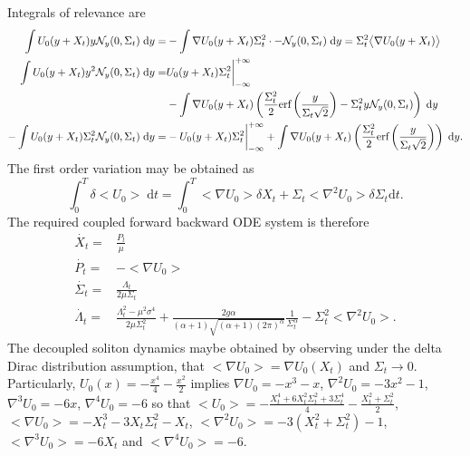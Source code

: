 \documentclass[letterpaper, 12pt]{article}
\newcommand{\rd}{{\mathrm d}}
\newcommand{\calN}{{\cal N}}
\begin{document}
Integrals of relevance are
\begin{align}
	\int U_0(y + X_t) y \calN_y(0,\Sigma_t) \; \rd y =& -\int \nabla U_0(y + X_t) \Sigma_t^2\cdot -\calN_y(0,\Sigma_t) \; \rd y = \Sigma_t^2 \big<  \nabla U_0(y + X_t) \big> \\
	\int U_0(y + X_t) y^2 \calN_y(0,\Sigma_t) \; \rd y =& U_0(y + X_t) \Sigma_t^2 \bigg|_{-\infty}^{+\infty} \\
	&- \int \nabla U_0(y + X_t) \left( \frac{\Sigma_t^2}{2}\text{erf}\left(\frac{y}{\Sigma_t \sqrt{2}}\right) - \Sigma_t^2 y \calN_y(0,\Sigma_t)   \right) \; \rd y \\
	-\int U_0(y + X_t) \Sigma_t^2 \calN_y(0,\Sigma_t) \; \rd y =& - U_0(y + X_t) \Sigma_t^2 \bigg|_{-\infty}^{+\infty} + \int \nabla U_0(y + X_t) \left( \frac{\Sigma_t^2}{2}\text{erf}\left(\frac{y}{\Sigma_t \sqrt{2}}\right) \right) \; \rd y.
\end{align}
The first order variation may be obtained as
\begin{equation}
	\int_{0}^{T} \delta \big< U_0 \big> \; \rd t = \int_{0}^{T} \big<\nabla U_0 \big> \delta X_t + \Sigma_t \big<\nabla^2 U_0 \big> \delta \Sigma_t \rd t.
\end{equation}
The required coupled forward backward ODE system is therefore
\begin{align}
	\dot{X_t} =& \frac{P_t}{\mu} \\
	\dot{P_t} =& - \big<\nabla U_0 \big> \\
	\dot{\Sigma_t} =& \frac{\Lambda_t}{2\mu\Sigma_t} \\
	\dot{\Lambda_t} =& \frac{\Lambda_t^2 - \mu^2\sigma^4}{2\mu\Sigma_t^2} + \frac{2g\alpha}{(\alpha+1)\sqrt{(\alpha+1)(2\pi)^\alpha}} \frac{1}{\Sigma_t^{\alpha}} - \Sigma_t^2 \big<\nabla^2 U_0 \big> \label{Lambda}.
\end{align}
The decoupled soliton dynamics maybe obtained by observing under the delta Dirac distribution assumption, that $\big<\nabla U_0 \big> = \nabla U_0(X_t)$ and $\Sigma_t \rightarrow 0$. \\
\indent Particularly, $U_0(x) = -\frac{x^4}{4} - \frac{x^2}{2}$ implies $\nabla U_0 = -x^3 - x$, $\nabla^2 U_0 = -3x^2 - 1$, $\nabla^3 U_0 = -6x$, $\nabla^4 U_0 = -6$ so that $\big< U_0 \big> = -\frac{X_t^4 + 6X_t^2 \Sigma_t^2 + 3 \Sigma_t^4}{4} - \frac{X_t^2 + \Sigma_t^2}{2}$, $\big<\nabla U_0 \big> = -X_t^3 - 3X_t\Sigma_t^2 - X_t$, $\big<\nabla^2 U_0 \big> = -3(X_t^2 + \Sigma_t^2) - 1$, $\big<\nabla^3 U_0 \big> = -6X_t$ and $\big<\nabla^4 U_0 \big> = -6$.
\end{document}
